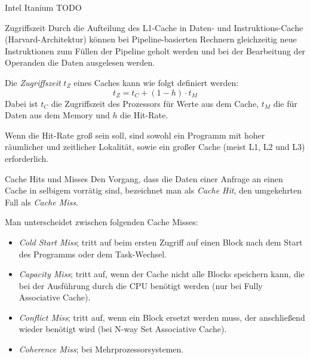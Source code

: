 \begin{example}[Cachehierarchie]{Intel Itanium}
    TODO
\end{example}

\begin{defi}[Cache]{Zugriffszeit}
    Durch die Aufteilung des L1-Cache in Daten- und Instruktions-Cache (Harvard-Architektur) können bei Pipeline-basierten Rechnern gleichzeitig neue Instruktionen zum Füllen der Pipeline geholt werden und bei der Bearbeitung der Operanden die Daten ausgelesen werden.

    Die \emph{Zugriffszeit} $t_Z$ eines Caches kann wie folgt definiert werden:
    \[
        t_Z = t_{C} + (1 - h) \cdot t_{M}
    \]
    Dabei ist $t_C$ die Zugriffszeit des Prozessors für Werte aus dem Cache, $t_M$ die für Daten aus dem Memory und $h$ die Hit-Rate.

    Wenn die Hit-Rate groß sein soll, sind sowohl ein Programm mit hoher räumlicher und zeitlicher Lokalität, sowie ein großer Cache (meist L1, L2 und L3) erforderlich.
\end{defi}

\begin{defi}{Cache Hits und Misses}
    Den Vorgang, dass die Daten einer Anfrage an einen Cache in selbigem vorrätig sind, bezeichnet man als \emph{Cache Hit}, den umgekehrten Fall als \emph{Cache Miss}.

    Man unterscheidet zwischen folgenden Cache Misses:
    \begin{itemize}
        \item \emph{Cold Start Miss}; tritt auf beim ersten Zugriff auf einen Block nach dem Start des Programms oder dem Task-Wechsel.
        \item \emph{Capacity Miss}; tritt auf, wenn der Cache nicht alle Blocks speichern kann, die bei der Ausführung durch die CPU benötigt werden (nur bei Fully Associative Cache).
        \item \emph{Conflict Miss}; tritt auf, wenn ein Block ersetzt werden muss, der anschließend wieder benötigt wird (bei N-way Set Associative Cache).
        \item \emph{Coherence Miss}; bei Mehrprozessorsystemen.
    \end{itemize}
\end{defi}


